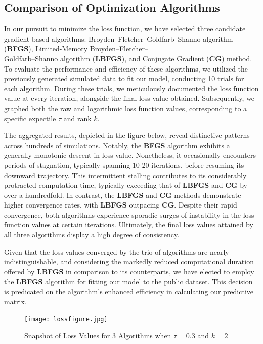 \documentclass{article}
\begin{document}
\subsection{Comparison of Optimization Algorithms}

In our pursuit to minimize the loss function, we have selected three candidate gradient-based algorithms: Broyden–Fletcher–Goldfarb–Shanno algorithm (\textbf{BFGS}), Limited-Memory Broyden–Fletcher–\\ Goldfarb–Shanno algorithm (\textbf{LBFGS}), and Conjugate Gradient (\textbf{CG}) method. To evaluate the performance and efficiency of these algorithms, we utilized the previously generated simulated data to fit our model, conducting 10 trials for each algorithm. During these trials, we meticulously documented the loss function value at every iteration, alongside the final loss value obtained. Subsequently, we graphed both the raw and logarithmic loss function values, corresponding to a specific expectile $\tau$ and rank $k$.

The aggregated results, depicted in the figure below, reveal distinctive patterns across hundreds of simulations. Notably, the \textbf{BFGS} algorithm exhibits a generally monotonic descent in loss value. Nonetheless, it occasionally encounters periods of stagnation, typically spanning 10-20 iterations, before resuming its downward trajectory. This intermittent stalling contributes to its considerably protracted computation time, typically exceeding that of \textbf{LBFGS} and \textbf{CG} by over a hundredfold. In contrast, the \textbf{LBFGS} and \textbf{CG} methods demonstrate higher convergence rates, with \textbf{LBFGS} outpacing \textbf{CG}. Despite their rapid convergence, both algorithms experience sporadic surges of instability in the loss function values at certain iterations. Ultimately, the final loss values attained by all three algorithms display a high degree of consistency.

Given that the loss values converged by the trio of algorithms are nearly indistinguishable, and considering the markedly reduced computational duration offered by \textbf{LBFGS} in comparison to its counterparts, we have elected to employ the \textbf{LBFGS} algorithm for fitting our model to the public dataset. This decision is predicated on the algorithm's enhanced efficiency in calculating our predictive matrix.

\begin{figure}[h]
    \centering
    \texttt{[image: lossfigure.jpg]}
    \caption{Snapshot of Loss Values for 3 Algorithms when $\tau = 0.3$ and $k = 2$}
    \label{Snapshot of Loss Values for 3 Algorithms when $\tau = 0.3$ and $k = 2$}
\end{figure}
\FloatBarrier
\end{document}
